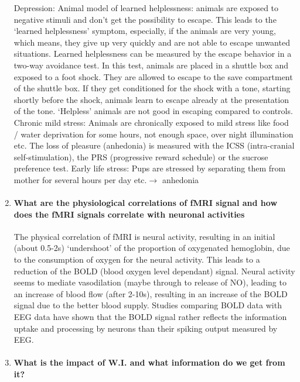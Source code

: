 \documentclass[12pt,article,oneside,a4paper]{memoir}
\begin{document}
\begin{enumerate}
	Depression:
	Animal model of learned helplessness: animals are exposed to negative stimuli and don’t get the possibility to escape. This leads to the ‘learned helplessness’ symptom, especially, if the animals are very young, which means, they give up very quickly and are not able to escape unwanted situations. Learned helplessness can be measured by the escape behavior in a two-way avoidance test. In this test, animals are placed in a shuttle box and exposed to a foot shock. They are allowed to escape to the save compartment of the shuttle box. If they get conditioned for the shock with a tone, starting shortly before the shock, animals learn to escape already at the presentation of the tone. ‘Helpless’ animals are not good in escaping compared to controls.
	Chronic mild stress: Animals are chronically exposed to mild stress like food / water deprivation for some hours, not enough space, over night illumination etc. The loss of pleasure (anhedonia) is measured with the ICSS (intra-cranial self-stimulation), the PRS (progressive reward schedule) or the sucrose preference test.
	Early life stress: Pups are stressed by separating them from mother for several hours per day etc.$\rightarrow$ anhedonia
	
\item \paragraph{What are the physiological correlations of fMRI signal and how does the fMRI signals correlate with neuronal activities
}

The physical correlation of fMRI is neural activity, resulting in an initial (about 0.5-2s) ‘undershoot’ of the proportion of oxygenated hemoglobin, due to the consumption of oxygen for the neural activity. This leads to a reduction of the BOLD (blood oxygen level dependant) signal. Neural activity seems to mediate vasodilation (maybe through to release of NO), leading to an increase of blood flow (after 2-10s), resulting in an increase of the BOLD signal due to the better blood supply. Studies comparing BOLD data with EEG data have shown that the BOLD signal rather reflects the information uptake and processing by neurons than their spiking output measured by EEG.

\item \paragraph{What is the impact of W.I. and what information do we get from it?}


\end{enumerate}
\end{document}
